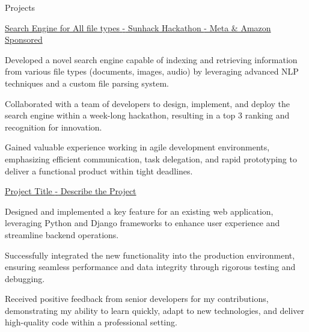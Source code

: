 \documentclass{resume} %
\begin{document}
    \begin{rSection}{Projects}
                    \begin{rSubsection}
                                    {\href{https://devpost.com/software/team{-}soul{-}1fjgwo}{Search Engine for All file types {-} Sunhack Hackathon {-} Meta \& Amazon Sponsored}}
                                {}{}{}
                                    \item Developed a novel search engine capable of indexing and retrieving information from various file types (documents, images, audio) by leveraging advanced NLP techniques and a custom file parsing system.
                                    \item Collaborated with a team of developers to design, implement, and deploy the search engine within a week{-}long hackathon, resulting in a top 3 ranking and recognition for innovation.
                                    \item Gained valuable experience working in agile development environments, emphasizing efficient communication, task delegation, and rapid prototyping to deliver a functional product within tight deadlines.
                            \end{rSubsection}
                    \begin{rSubsection}
                                    {\href{https://example.com/project{-}repo}{Project Title {-} Describe the Project}}
                                {}{}{}
                                    \item Designed and implemented a key feature for an existing web application, leveraging Python and Django frameworks to enhance user experience and streamline backend operations.
                                    \item Successfully integrated the new functionality into the production environment, ensuring seamless performance and data integrity through rigorous testing and debugging.
                                    \item Received positive feedback from senior developers for my contributions, demonstrating my ability to learn quickly, adapt to new technologies, and deliver high{-}quality code within a professional setting.
                            \end{rSubsection}
            \end{rSection}
\end{document}

